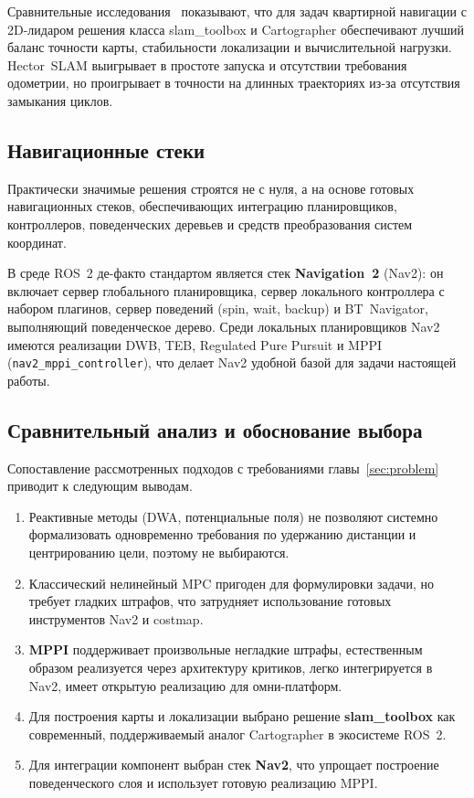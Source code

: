 Сравнительные исследования~\cite{Sreerambatla2021SLAM,Nguyen2022SLAM}
показывают, что для задач квартирной навигации с 2D-лидаром решения
класса slam\_toolbox и Cartographer обеспечивают лучший баланс
точности карты, стабильности локализации и вычислительной нагрузки.
Hector~SLAM выигрывает в простоте запуска и отсутствии требования
одометрии, но проигрывает в точности на длинных траекториях из-за
отсутствия замыкания циклов.

\subsection{Навигационные стеки}

Практически значимые решения строятся не с нуля, а на основе
готовых навигационных стеков, обеспечивающих интеграцию планировщиков,
контроллеров, поведенческих деревьев и средств преобразования систем координат.

В среде ROS~2 де-факто стандартом является стек \textbf{Navigation~2}
(Nav2): он включает сервер глобального планировщика, сервер локального
контроллера с набором плагинов, сервер поведений (spin, wait, backup) и
BT~Navigator, выполняющий поведенческое дерево. Среди локальных
планировщиков Nav2 имеются реализации DWB, TEB, Regulated Pure Pursuit и
MPPI (\texttt{nav2\_mppi\_controller}), что делает Nav2 удобной базой для
задачи настоящей работы.

\subsection{Сравнительный анализ и обоснование выбора}

Сопоставление рассмотренных подходов с требованиями
главы~\ref{sec:problem} приводит к следующим выводам.
\begin{enumerate}
    \item Реактивные методы (DWA, потенциальные поля) не позволяют
          системно формализовать одновременно требования по удержанию
          дистанции и центрированию цели, поэтому не выбираются.
    \item Классический нелинейный MPC пригоден для формулировки задачи,
          но требует гладких штрафов, что затрудняет использование
          готовых инструментов Nav2 и costmap.
    \item \textbf{MPPI} поддерживает произвольные негладкие штрафы,
          естественным образом реализуется через архитектуру критиков,
          легко интегрируется в Nav2, имеет открытую реализацию для
          омни-платформ.
    \item Для построения карты и локализации выбрано решение
          \textbf{slam\_toolbox} как современный, поддерживаемый аналог
          Cartographer в экосистеме ROS~2.
    \item Для интеграции компонент выбран стек \textbf{Nav2}, что
          упрощает построение поведенческого слоя и использует готовую
          реализацию MPPI.
\end{enumerate}

